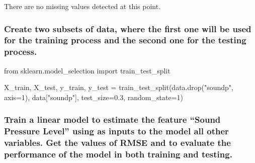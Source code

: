 \documentclass[
  letterpaper,
  DIV=11,
  numbers=noendperiod]{scrartcl}
\newenvironment{Shaded}{\begin{snugshade}}{\end{snugshade}}
\newcommand{\DecValTok}[1]{\textcolor[rgb]{0.68,0.00,0.00}{#1}}
\newcommand{\FloatTok}[1]{\textcolor[rgb]{0.68,0.00,0.00}{#1}}
\newcommand{\ImportTok}[1]{\textcolor[rgb]{0.00,0.46,0.62}{#1}}
\newcommand{\NormalTok}[1]{\textcolor[rgb]{0.00,0.23,0.31}{#1}}
\newcommand{\OperatorTok}[1]{\textcolor[rgb]{0.37,0.37,0.37}{#1}}
\newcommand{\StringTok}[1]{\textcolor[rgb]{0.13,0.47,0.30}{#1}}
\begin{document}
There are no missing values detected at this point.

\hypertarget{create-two-subsets-of-data-where-the-first-one-will-be-used-for-the-training-process-and-the-second-one-for-the-testing-process.}{%
\subsubsection{Create two subsets of data, where the first one will be
used for the training process and the second one for the testing
process.}\label{create-two-subsets-of-data-where-the-first-one-will-be-used-for-the-training-process-and-the-second-one-for-the-testing-process.}}

\begin{Shaded}
\begin{Highlighting}[]
\ImportTok{from}\NormalTok{ sklearn.model\_selection }\ImportTok{import}\NormalTok{ train\_test\_split}

\NormalTok{X\_train, X\_test, y\_train, y\_test }\OperatorTok{=}\NormalTok{ train\_test\_split(data.drop(}\StringTok{"soundp"}\NormalTok{, axis}\OperatorTok{=}\DecValTok{1}\NormalTok{),}
\NormalTok{                                                    data[}\StringTok{"soundp"}\NormalTok{],}
\NormalTok{                                                    test\_size}\OperatorTok{=}\FloatTok{0.3}\NormalTok{, random\_state}\OperatorTok{=}\DecValTok{1}\NormalTok{)}
\end{Highlighting}
\end{Shaded}

\hypertarget{train-a-linear-model-to-estimate-the-feature-sound-pressure-level-using-as-inputs-to-the-model-all-other-variables.-get-the-values-of-rmse-and-to-evaluate-the-performance-of-the-model-in-both-training-and-testing.}{%
\subsubsection{Train a linear model to estimate the feature ``Sound
Pressure Level'' using as inputs to the model all other variables. Get
the values of RMSE and to evaluate the performance of the model in both
training and
testing.}\label{train-a-linear-model-to-estimate-the-feature-sound-pressure-level-using-as-inputs-to-the-model-all-other-variables.-get-the-values-of-rmse-and-to-evaluate-the-performance-of-the-model-in-both-training-and-testing.}}
\end{document}
